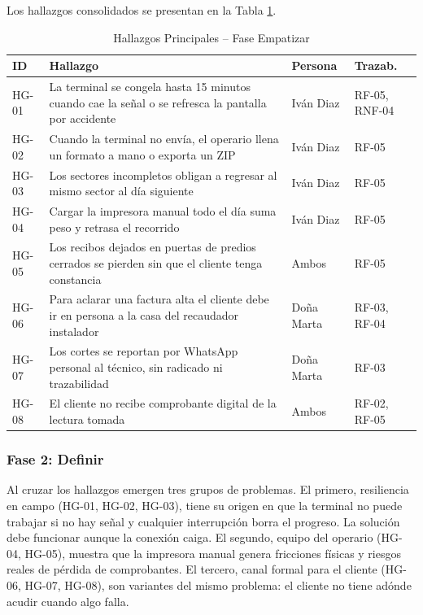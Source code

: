 \documentclass[12pt, a4paper]{article}
\begin{document}
\vspace{6pt}
\noindent Los hallazgos consolidados se presentan en la Tabla \ref{tab:hallazgos}.

\begin{table}[H]
  \caption{Hallazgos Principales -- Fase Empatizar}
  \label{tab:hallazgos}
  \centering
  \small
  \begin{tabular}{p{1.2cm} p{7.8cm} p{2.5cm} p{2.2cm}}
    \toprule
    \textbf{ID} & \textbf{Hallazgo} & \textbf{Persona} & \textbf{Trazab.} \\
    \midrule
    HG-01 & La terminal se congela hasta 15 minutos cuando cae la señal o se refresca la pantalla por accidente & Iván Diaz & RF-05, RNF-04 \\
    HG-02 & Cuando la terminal no envía, el operario llena un formato a mano o exporta un ZIP & Iván Diaz & RF-05 \\
    HG-03 & Los sectores incompletos obligan a regresar al mismo sector al día siguiente & Iván Diaz & RF-05 \\
    HG-04 & Cargar la impresora manual todo el día suma peso y retrasa el recorrido & Iván Diaz & RF-05 \\
    HG-05 & Los recibos dejados en puertas de predios cerrados se pierden sin que el cliente tenga constancia & Ambos & RF-05 \\
    HG-06 & Para aclarar una factura alta el cliente debe ir en persona a la casa del recaudador instalador & Doña Marta & RF-03, RF-04 \\
    HG-07 & Los cortes se reportan por WhatsApp personal al técnico, sin radicado ni trazabilidad & Doña Marta & RF-03 \\
    HG-08 & El cliente no recibe comprobante digital de la lectura tomada & Ambos & RF-02, RF-05 \\
    \bottomrule
  \end{tabular}
\end{table}

\subsubsection{Fase 2: Definir}

\noindent Al cruzar los hallazgos emergen tres grupos de problemas. El primero, resiliencia en campo (HG-01, HG-02, HG-03), tiene su origen en que la terminal no puede trabajar si no hay señal y cualquier interrupción borra el progreso. La solución debe funcionar aunque la conexión caiga. El segundo, equipo del operario (HG-04, HG-05), muestra que la impresora manual genera fricciones físicas y riesgos reales de pérdida de comprobantes. El tercero, canal formal para el cliente (HG-06, HG-07, HG-08), son variantes del mismo problema: el cliente no tiene adónde acudir cuando algo falla.
\end{document}
